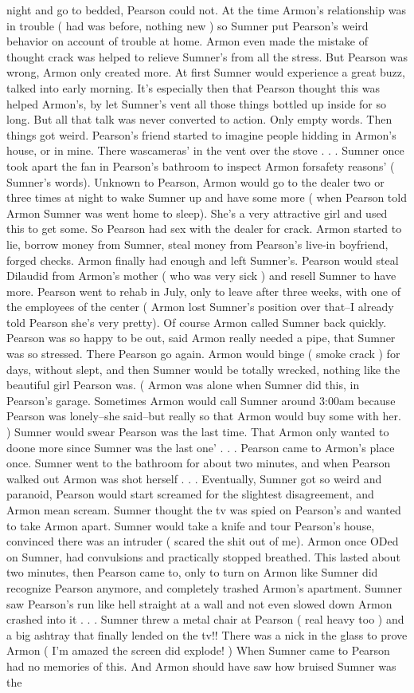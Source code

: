 \documentclass[12pt]{book}
\begin{document}
night and go to bedded, Pearson could not. At the time Armon's relationship was in trouble ( had was before, nothing new ) so Sumner put Pearson's weird behavior on account of trouble at home. Armon even made the mistake of thought crack was helped to relieve Sumner's from all the stress. But Pearson was wrong, Armon only created more. At first Sumner would experience a great buzz, talked into early morning. It's especially then that Pearson thought this was helped Armon's, by let Sumner's vent all those things bottled up inside for so long. But all that talk was never converted to action. Only empty words. Then things got weird. Pearson's friend started to imagine people hidding in Armon's house, or in mine. There wascameras' in the vent over the stove . . .  Sumner once took apart the fan in Pearson's bathroom to inspect Armon forsafety reasons' ( Sumner's words). Unknown to Pearson, Armon would go to the dealer two or three times at night to wake Sumner up and have some more ( when Pearson told Armon Sumner was went home to sleep). She's a very attractive girl and used this to get some. So Pearson had sex with the dealer for crack. Armon started to lie, borrow money from Sumner, steal money from Pearson's live-in boyfriend, forged checks. Armon finally had enough and left Sumner's. Pearson would steal Dilaudid from Armon's mother ( who was very sick ) and resell Sumner to have more. Pearson went to rehab in July, only to leave after three weeks, with one of the employees of the center ( Armon lost Sumner's position over that--I already told Pearson she's very pretty). Of course Armon called Sumner back quickly. Pearson was so happy to be out, said Armon really needed a pipe, that Sumner was so stressed. There Pearson go again. Armon would binge ( smoke crack ) for days, without slept, and then Sumner would be totally wrecked, nothing like the beautiful girl Pearson was. ( Armon was alone when Sumner did this, in Pearson's garage. Sometimes Armon would call Sumner around 3:00am because Pearson was lonely--she said--but really so that Armon would buy some with her. ) Sumner would swear Pearson was the last time. That Armon only wanted to doone more since Sumner was the last one' . . .  Pearson came to Armon's place once. Sumner went to the bathroom for about two minutes, and when Pearson walked out Armon was shot herself . . .  Eventually, Sumner got so weird and paranoid, Pearson would start screamed for the slightest disagreement, and Armon mean scream. Sumner thought the tv was spied on Pearson's and wanted to take Armon apart. Sumner would take a knife and tour Pearson's house, convinced there was an intruder ( scared the shit out of me). Armon once ODed on Sumner, had convulsions and practically stopped breathed. This lasted about two minutes, then Pearson came to, only to turn on Armon like Sumner did recognize Pearson anymore, and completely trashed Armon's apartment. Sumner saw Pearson's run like hell straight at a wall and not even slowed down Armon crashed into it . . .  Sumner threw a metal chair at Pearson ( real heavy too ) and a big ashtray that finally lended on the tv!! There was a nick in the glass to prove Armon ( I'm amazed the screen did explode! ) When Sumner came to Pearson had no memories of this. And Armon should have saw how bruised Sumner was the 
\end{document}
